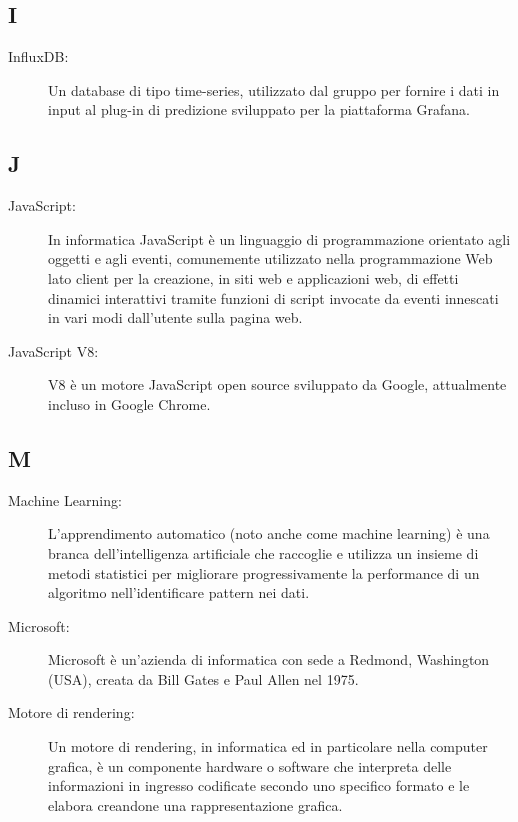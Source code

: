 \documentclass[../manuale-sviluppatore.tex]{subfiles}
\begin{document}
\subsection*{I}
\begin{description}
  \item [InfluxDB:] Un database di tipo time-series, utilizzato dal gruppo per fornire i dati in input al plug-in di predizione sviluppato per la piattaforma Grafana.
\end{description}

\subsection*{J}
\begin{description}
  \item[JavaScript:] In informatica JavaScript è un linguaggio di programmazione orientato agli oggetti e agli eventi, comunemente utilizzato nella programmazione Web lato client per la creazione, in siti web e applicazioni web, di effetti dinamici interattivi tramite funzioni di script invocate da eventi innescati in vari modi dall'utente sulla pagina web.
  \item[JavaScript V8:] V8 è un motore JavaScript open source sviluppato da Google, attualmente incluso in Google Chrome.
\end{description}

\subsection*{M}
\begin{description}
  \item[Machine Learning:] L’apprendimento automatico (noto anche come machine learning) è una branca dell'intelligenza artificiale che raccoglie e utilizza un insieme di metodi statistici per migliorare progressivamente la performance di un algoritmo nell'identificare pattern nei dati.
  \item[Microsoft:] Microsoft è un'azienda di informatica con sede a Redmond, Washington (USA), creata da Bill Gates e Paul Allen nel 1975.
  \item[Motore di rendering:] Un motore di rendering, in informatica ed in particolare nella computer grafica, è un componente hardware o software che interpreta delle informazioni in ingresso codificate secondo uno specifico formato e le elabora creandone una rappresentazione grafica.
\end{description}
\end{document}
